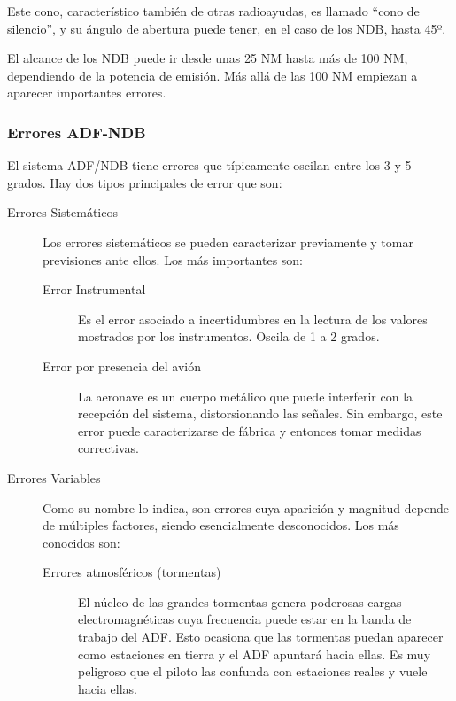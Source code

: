 Este cono, caracter\'istico tambi\'en de otras radioayudas, es llamado ``cono de silencio'', y su \'angulo de abertura puede tener, en el caso de los NDB, hasta 45º.

El alcance de los NDB puede ir desde unas 25 NM hasta m\'as de 100 NM, dependiendo de la potencia de emisi\'on. M\'as all\'a de las 100 NM empiezan a aparecer importantes errores.

\subsubsection{Errores ADF-NDB}

El sistema ADF/NDB tiene errores que t\'ipicamente oscilan entre los 3 y 5 grados. Hay dos tipos principales de error que son:

\begin{description}
\item [Errores Sistem\'aticos]

Los errores sistem\'aticos se pueden caracterizar previamente y tomar previsiones ante ellos. Los m\'as importantes son:

\begin{description}
\item [Error Instrumental]

Es el error asociado a incertidumbres en la lectura de los valores mostrados por los instrumentos. Oscila de 1 a 2 grados.

\item [Error por presencia del avi\'on]

La aeronave es un cuerpo met\'alico que puede interferir con la recepci\'on del sistema, distorsionando las se\~nales. Sin embargo, este error puede caracterizarse de f\'abrica y entonces tomar medidas correctivas.

\end{description}


\item [Errores Variables]

Como su nombre lo indica, son errores cuya aparici\'on y magnitud depende de m\'ultiples factores, siendo esencialmente desconocidos. Los m\'as conocidos son:

\begin{description}

\item [Errores atmosf\'ericos (tormentas)]

El n\'ucleo de las grandes tormentas genera poderosas cargas electromagn\'eticas cuya frecuencia puede estar en la banda de trabajo del ADF. Esto ocasiona que las tormentas puedan aparecer como estaciones en tierra y el ADF apuntar\'a hacia ellas. Es muy peligroso que el piloto las confunda con estaciones reales y vuele hacia ellas.



\end{description}
\end{description}
